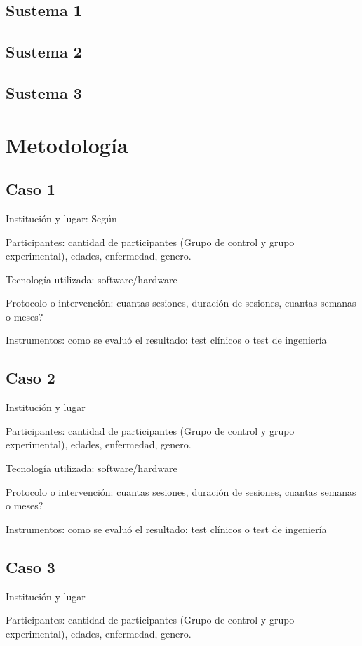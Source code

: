 \documentclass[journal]{IEEEtran}
\begin{document}
\subsection{Sustema 1}
\subsection{Sustema 2}
\subsection{Sustema 3}


\section{Metodología}
\subsection{Caso 1}
Institución y lugar: Según \cite{Cedric}

Participantes: cantidad de participantes (Grupo de control y grupo experimental), edades, enfermedad, genero.

Tecnología utilizada: software/hardware 

Protocolo o intervención: cuantas sesiones, duración de sesiones, cuantas semanas o meses?

Instrumentos: como se evaluó el resultado: test clínicos o test de ingeniería 

\subsection{Caso 2}
Institución y lugar

Participantes: cantidad de participantes (Grupo de control y grupo experimental), edades, enfermedad, genero.

Tecnología utilizada: software/hardware 

Protocolo o intervención: cuantas sesiones, duración de sesiones, cuantas semanas o meses?

Instrumentos: como se evaluó el resultado: test clínicos o test de ingeniería 


\subsection{Caso 3}
Institución y lugar

Participantes: cantidad de participantes (Grupo de control y grupo experimental), edades, enfermedad, genero.
\end{document}
